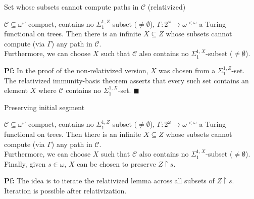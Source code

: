\begin{frame}{Set whose subsets cannot compute paths in $\mathcal{C}$
(relativized)}
  \begin{main-lemma*}[Relativized]
    $\mathcal{C}\subseteq\omega^\omega$ compact, contains no
    $\Sigma_1^{1,Z}$-subset ($\neq\emptyset$),
    $\Gamma:2^{\omega}\rightarrow \omega^{<\omega}$ a Turing functional on
    trees. Then there is an infinite $X\subseteq Z$ whose subsets cannot
    compute (via $\Gamma$) any path in $\mathcal{C}$.\\
    \vspace{0.5em}
    Furthermore, we can choose $X$ such that $\mathcal{C}$ also contains no
    $\Sigma_1^{1,X}$-subset ($\neq\emptyset$).
  \end{main-lemma*}

  \vspace{1em}
  \textbf{Pf:} In the proof of the non-relativized version, $X$ was chosen
  from a $\Sigma_1^{1,Z}$-set. The relativized immunity-basis theorem
  asserts that every such set contains an element $X$ where $\mathcal{C}$
  contains no $\Sigma_1^{1,X}$-set. $\blacksquare$
\end{frame}

\begin{frame}{Preserving initial segment}
  \begin{main-lemma*}
    $\mathcal{C}\subseteq\omega^\omega$ compact, contains no
    $\Sigma_1^{1,Z}$-subset ($\neq\emptyset$),
    $\Gamma:2^{\omega}\rightarrow \omega^{<\omega}$ a Turing functional on
    trees. Then there is an infinite $X\subseteq Z$ whose subsets cannot
    compute (via $\Gamma$) any path in $\mathcal{C}$.\\
    \vspace{0.5em}
    Furthermore, we can choose $X$ such that $\mathcal{C}$ also contains no
    $\Sigma_1^{1,X}$-subset ($\neq\emptyset$).\\
    \vspace{0.5em}
    Finally, given $s\in\omega$, $X$ can be chosen to preserve
    $Z\restriction s$.
  \end{main-lemma*}

  \vspace{1em}
  \textbf{Pf:} The idea is to iterate the relativized lemma across all
  subsets of $Z\restriction s$. Iteration is possible after relativization.
\end{frame}

